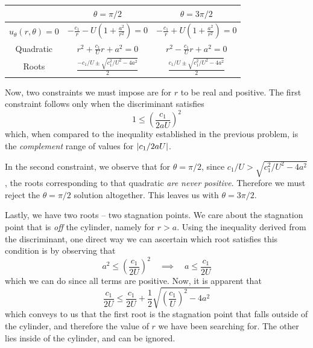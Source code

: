 \documentclass[a4paper]{article}
\begin{document}
\begin{center}
	\renewcommand{\arraystretch}{1.8}
	\setlength{\arraycolsep}{10pt}
	\begin{tabular}{|c||c|c|}
		\hline
		\rule[-1.2em]{0pt}{3em}
		& \( \theta = \pi / 2 \) & \( \theta = 3 \pi / 2 \) \\
		\hline\hline
		\rule[-1.2em]{0pt}{3em}
		\( u_{\theta}\!\left( r, \theta \right) = 0 \)
		& \( \displaystyle{-\frac{c_{1}}{r} - U \!\left( 1 + \frac{a^{2}}{r^{2}} \right) = 0} \)
		& \( \displaystyle{-\frac{c_{1}}{r} + U \!\left( 1 + \frac{a^{2}}{r^{2}} \right) = 0} \) \\
		\hline
		\rule[-1.2em]{0pt}{3em}
		Quadratic
		& \( \displaystyle{r^{2} + \frac{c_{1}}{U}r + a^{2} = 0} \)
		& \( \displaystyle{r^{2} - \frac{c_{1}}{U}r + a^{2} = 0} \) \\
		\hline
		\rule[-1.2em]{0pt}{3em}
		Roots
		& \( \displaystyle{\frac{-c_{1} / U \pm \sqrt{c^{2}_{1} / U^{2} - 4a^{2}}}{2}} \)
		& \( \displaystyle{\frac{c_{1} / U \pm \sqrt{c^{2}_{1} / U^{2} - 4a^{2}}}{2}} \) \\
		\hline
	\end{tabular}
\end{center}

Now, two constraints we must impose are for \( r \) to be real and positive. The first constraint follows only when the discriminant satisfies
\[
	1 \le \!\left( \frac{c_{1}}{2aU} \right)^{2} 
\]
which, when compared to the inequality established in the previous problem, is the \textit{complement} range of values for \( \abs{c_{1} / 2aU} \).

In the second constraint, we observe that for \( \theta = \pi / 2 \), since \( c_{1} / U > \sqrt{c^{2}_{1} / U^{2} - 4a^{2}} \), the roots corresponding to that quadratic \textit{are never positive}. Therefore we must reject the \( \theta = \pi / 2 \) solution altogether. This leaves us with \( \theta = 3 \pi / 2 \).

Lastly, we have two roots -- two stagnation points. We care about the stagnation point that is \textit{off} the cylinder, namely for \( r > a \). Using the inequality derived from the discriminant, one direct way we can ascertain which root satisfies this condition is by observing that
\[
	a^{2} \le \!\left( \frac{c_{1}}{2U} \right)^{2} \quad \implies \quad a \le \frac{c_{1}}{2U}
\]
which we can do since all terms are positive. Now, it is apparent that
\[
	\frac{c_{1}}{2U} \le \frac{c_{1}}{2U} + \frac{1}{2}\sqrt{\!\left( \frac{c_{1}}{U} \right)^{2} - 4a^{2}} 
\]
which conveys to us that the first root is the stagnation point that falls outside of the cylinder, and therefore the value of \( r \) we have been searching for. The other lies inside of the cylinder, and can be ignored.
\end{document}
